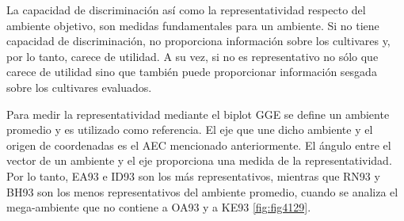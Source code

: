 

La capacidad de discriminación así como la representatividad respecto del ambiente objetivo, son medidas fundamentales para un ambiente. Si no tiene capacidad de discriminación, no proporciona información sobre los cultivares y, por lo tanto, carece de utilidad. A su vez, si no es representativo no sólo que carece de utilidad sino que también puede proporcionar información sesgada sobre los cultivares evaluados.

Para medir la representatividad mediante el biplot GGE se define un ambiente promedio y es utilizado como referencia. El eje que une dicho ambiente y el origen de coordenadas es el AEC mencionado anteriormente. El ángulo entre el vector de un ambiente y el eje proporciona una medida de la representatividad. Por lo tanto, EA93 e ID93 son los más representativos, mientras que RN93 y BH93 son los menos representativos del ambiente promedio, cuando se analiza el mega-ambiente que no contiene a OA93 y a KE93 \ref{fig:fig4129}.

